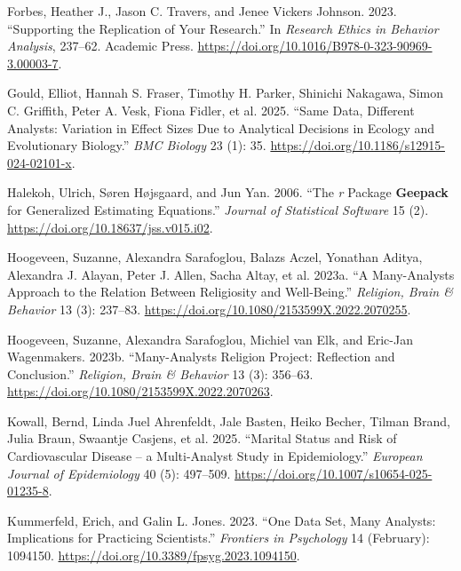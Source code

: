 \documentclass[
  letterpaper,
  DIV=11,
  numbers=noendperiod]{scrartcl}
\newlength{\cslhangindent}
\newenvironment{CSLReferences}[2] %
 {\begin{list}{}{%
  \setlength{\itemindent}{0pt}
  \setlength{\leftmargin}{0pt}
  \setlength{\parsep}{0pt}
  \ifodd #1
   \setlength{\leftmargin}{\cslhangindent}
   \setlength{\itemindent}{-1\cslhangindent}
  \fi
  \setlength{\itemsep}{#2\baselineskip}}}
 {\end{list}}
\begin{document}
\begin{CSLReferences}{1}{0}
Forbes, Heather J., Jason C. Travers, and Jenee Vickers Johnson. 2023.
{``Supporting the Replication of Your Research.''} In \emph{Research
{Ethics} in {Behavior} {Analysis}}, 237--62. Academic Press.
\url{https://doi.org/10.1016/B978-0-323-90969-3.00003-7}.

Gould, Elliot, Hannah S. Fraser, Timothy H. Parker, Shinichi Nakagawa,
Simon C. Griffith, Peter A. Vesk, Fiona Fidler, et al. 2025. {``Same
Data, Different Analysts: Variation in Effect Sizes Due to Analytical
Decisions in Ecology and Evolutionary Biology.''} \emph{BMC Biology} 23
(1): 35. \url{https://doi.org/10.1186/s12915-024-02101-x}.

Halekoh, Ulrich, Søren Højsgaard, and Jun Yan. 2006. {``The \emph{r}
{Package} \textbf{Geepack} for {Generalized} {Estimating}
{Equations}.''} \emph{Journal of Statistical Software} 15 (2).
\url{https://doi.org/10.18637/jss.v015.i02}.

Hoogeveen, Suzanne, Alexandra Sarafoglou, Balazs Aczel, Yonathan Aditya,
Alexandra J. Alayan, Peter J. Allen, Sacha Altay, et al. 2023a. {``A
Many-Analysts Approach to the Relation Between Religiosity and
Well-Being.''} \emph{Religion, Brain \& Behavior} 13 (3): 237--83.
\url{https://doi.org/10.1080/2153599X.2022.2070255}.

Hoogeveen, Suzanne, Alexandra Sarafoglou, Michiel van Elk, and Eric-Jan
Wagenmakers. 2023b. {``Many-Analysts Religion Project: Reflection and
Conclusion.''} \emph{Religion, Brain \& Behavior} 13 (3): 356--63.
\url{https://doi.org/10.1080/2153599X.2022.2070263}.

Kowall, Bernd, Linda Juel Ahrenfeldt, Jale Basten, Heiko Becher, Tilman
Brand, Julia Braun, Swaantje Casjens, et al. 2025. {``Marital Status and
Risk of Cardiovascular Disease -- a Multi-Analyst Study in
Epidemiology.''} \emph{European Journal of Epidemiology} 40 (5):
497--509. \url{https://doi.org/10.1007/s10654-025-01235-8}.

Kummerfeld, Erich, and Galin L. Jones. 2023. {``One Data Set, Many
Analysts: {Implications} for Practicing Scientists.''} \emph{Frontiers
in Psychology} 14 (February): 1094150.
\url{https://doi.org/10.3389/fpsyg.2023.1094150}.


\end{CSLReferences}
\end{document}
